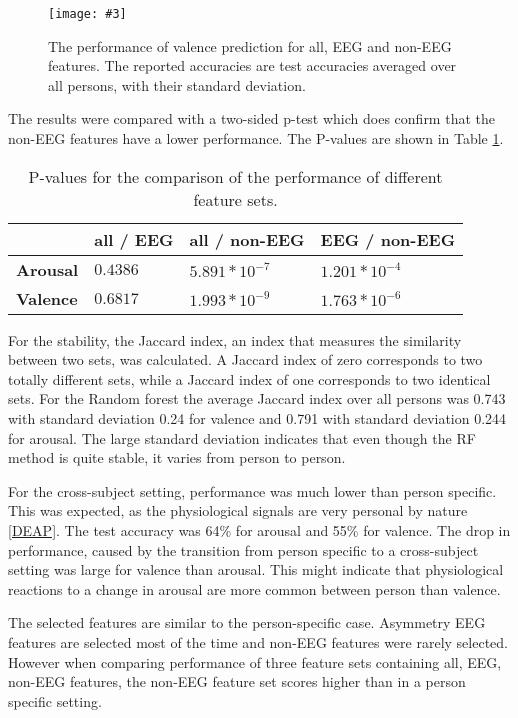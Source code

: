 \documentclass[12pt,journal,compsoc]{IEEEtran}
\newcommand{\npar}{\par \vspace{2.3ex plus 0.3ex minus 0.3ex}}
\newcommand{\mijnfiguur}[4][H]{            %
    \begin{figure}[#1]                      %
        \begin{center}                      %
            \texttt{[image: \#3]}        %
            \caption{#4\label{#3}}          %
        \end{center}
    \end{figure}
    }
\begin{document}
\mijnfiguur{width=.5\textwidth}{valencephyeegall}{The performance of valence prediction for all, EEG and non-EEG features. The reported accuracies are test accuracies averaged over all persons, with their standard deviation.}

The results were compared with a two-sided p-test which does confirm that the non-EEG features have a lower performance. The P-values are shown in Table \ref{pvals}.
\begin{table}[H]
\centering
\caption{P-values for the comparison of the performance of different feature sets.\label{pvals}}
\begin{tabular}{l|lll}
	    		 & \textbf{all / EEG} & \textbf{all / non-EEG} & \textbf{EEG / non-EEG} \\ \hline
\textbf{Arousal} & $0.4386$          & $5.891 * 10^{-7}$  & $1.201 * 10^{-4}$ \\
\textbf{Valence} & $0.6817$          & $1.993 * 10^{-9}$  & $1.763 * 10^{-6}$                 
\end{tabular}
\end{table}

For the stability, the Jaccard index, an index that measures the similarity between two sets, was calculated. A Jaccard index of zero corresponds to two totally different sets, while a Jaccard index of one corresponds to two identical sets. For the Random forest the average Jaccard index over all persons was 0.743 with standard deviation 0.24 for valence and 0.791 with standard deviation 0.244 for arousal. The large standard deviation indicates that even though the RF method is quite stable, it varies from person to person.

\npar
For the cross-subject setting, performance was much lower than person specific. This was expected, as the physiological signals are very personal by nature \ref{DEAP}. The test accuracy was 64\% for arousal and 55\% for valence. The drop in performance, caused by the transition from person specific to a cross-subject setting was large for valence than arousal. This might indicate that physiological reactions to a change in arousal are more common between person than valence. 

\npar

The selected features are similar to the person-specific case. Asymmetry EEG features are selected most of the time and non-EEG features were rarely selected. However when comparing performance of three feature sets containing all, EEG, non-EEG features, the non-EEG feature set scores higher than in a person specific setting.
\end{document}
